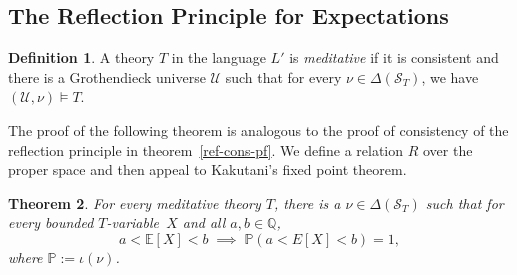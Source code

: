 \documentclass[12pt]{article}
\newcommand{\PP}{\mathbb{P}}
\newcommand{\EE}{\mathbb{E}}
\newcommand{\QQ}{\mathbb{Q}}
\newcommand{\cL}{L'}
\newcommand{\cS}{\mathcal{S}}
\newcommand{\cU}{\mathcal{U}}
\newcommand{\Tvar}{$T$-variable}
\theoremstyle{plain}
\newtheorem{theorem}{Theorem}[subsection]
\theoremstyle{definition}
\newtheorem{definition}[theorem]{Definition}
\theoremstyle{remark}
\begin{document}
\subsection{The Reflection Principle for Expectations}
\begin{definition}
A theory $T$ in the language $\cL$ is \emph{meditative} if it is consistent and there is a Grothendieck universe $\cU$ such that for every $\nu\in\Delta(\cS_T)$, we have $(\cU,\nu)\vDash T$.
\end{definition}
The proof of the following theorem is analogous to the proof of consistency of the reflection principle in theorem~\ref{ref-cons-pf}.
We define a relation $R$ over the proper space and then appeal to Kakutani's fixed point theorem.
\begin{theorem}
For every meditative theory $T$, there is a $\nu\in\Delta(\cS_T)$ such that for every bounded \Tvar{}~$X$ and all $a,b\in\QQ$,
\[a<\EE[X]<b\;\implies\;\PP( a < E[X] <  b) = 1,\]
where $\PP:=\iota(\nu)$.
\end{theorem}
\end{document}
